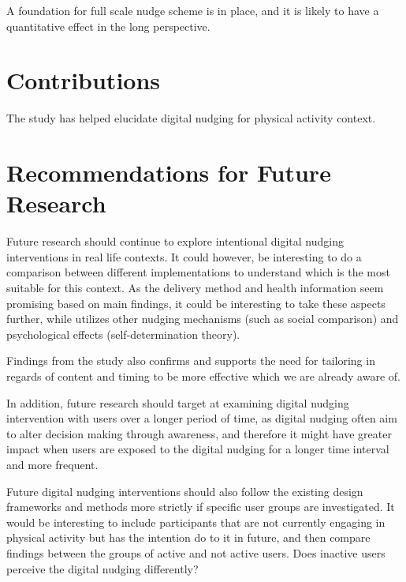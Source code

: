 A foundation for full scale nudge scheme is in place, and it is likely to have a quantitative effect in the long perspective. 



\section{Contributions}
The study has helped elucidate digital nudging for physical activity context. 


\section{Recommendations for Future Research}
Future research should continue to explore intentional digital nudging interventions in real life contexts. It could however, be interesting to do a comparison between different implementations to understand which is the most suitable for this context. As the delivery method and health information seem promising based on main findings, it could be interesting to take these aspects further, while utilizes other nudging mechanisms (such as social comparison) and psychological effects (self-determination theory). 

Findings from the study also confirms and supports the need for tailoring in regards of content and timing to be more effective which we are already aware of. 

In addition, future research should target at examining digital nudging intervention with users over a longer period of time, as digital nudging often aim to alter decision making through awareness, and therefore it might have greater impact when users are exposed to the digital nudging for a longer time interval and more frequent.

Future digital nudging interventions should also follow the existing design frameworks and methods more strictly if specific user groups are investigated. It would be interesting to include participants that are not currently engaging in physical activity but has the intention do to it in future, and then compare findings between the groups of active and not active users. Does inactive users perceive the digital nudging differently?

